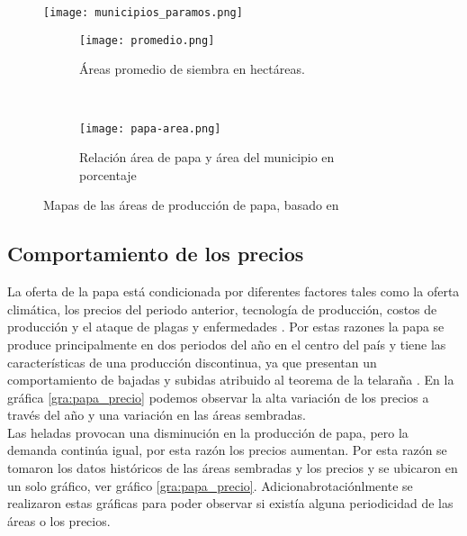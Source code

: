 \documentclass[11pt]{article}
\begin{document}
\begin{figure}[H]
	\begin{center}
		\texttt{[image: municipios\_paramos.png]}
		\caption{}
		\label{gra:areas_paramo}
	\end{center}
\end{figure}
	

\begin{figure}[H]
	\begin{center}
		\begin{subfigure}[normla]{0.4\textwidth}
	\texttt{[image: promedio.png]}
		\caption{Áreas promedio de siembra en hectáreas.}
		\label{subfig:a1}
		\end{subfigure}
		~
				\begin{subfigure}[normla]{0.4\textwidth}
	\texttt{[image: papa-area.png]}
		\caption{Relación área de papa y área del municipio en porcentaje}
		\label{subfig:a2}
		\end{subfigure}

	\end{center}
	\caption{Mapas de las áreas de producción de papa, basado en \citet{madr2017}}
	\label{gra:areas}	
\end{figure}


\subsection{Comportamiento de los precios}

La oferta de la papa está condicionada por diferentes factores tales como la oferta climática, los precios del periodo anterior, tecnología de producción, costos de producción y el ataque de plagas y enfermedades \citep{Barrientos2014}. Por estas razones la papa se produce principalmente en dos periodos del año en el centro del país y tiene las características de una producción discontinua, ya que presentan un comportamiento de bajadas y subidas atribuido al teorema de la telaraña \citep{BarrientosF.2011, Ezekiel1938}. En la gráfica \ref{gra:papa_precio} podemos observar la alta variación de los precios a través del año y una variación en las áreas sembradas.\\


Las heladas provocan una disminución en la producción de papa, pero la demanda continúa igual, por esta razón los precios aumentan. Por esta razón se tomaron los datos históricos de las áreas sembradas y los precios y se ubicaron en un solo gráfico, ver gráfico \ref{gra:papa_precio}. Adicionabrotaciónlmente se realizaron estas gráficas para poder observar si existía alguna periodicidad de las áreas o los precios.\\
\end{document}
